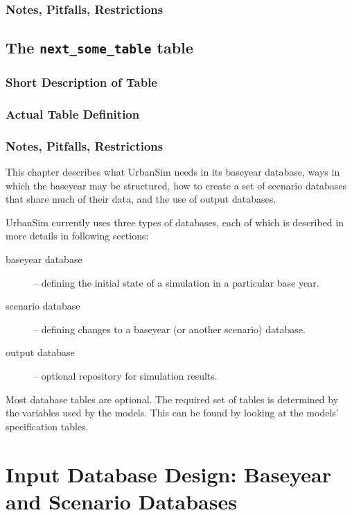 \subsubsection{Notes, Pitfalls, Restrictions}
\subsection{The {\tt next_some_table} table}
\subsubsection{Short Description of Table}
\subsubsection{Actual Table Definition}
\subsubsection{Notes, Pitfalls, Restrictions}

This chapter describes what UrbanSim needs in its baseyear database, ways in
which the baseyear may be structured, how to create a set of scenario databases
that share much of their data, and the use of output databases.

UrbanSim currently uses three types of databases, each of which is described in
more details in following sections:

\begin{description}
\item[baseyear database] -- defining the initial state of a simulation in a
particular base year.
\item[scenario database] -- defining changes to a baseyear (or another scenario)
database.
\item[output database] -- optional repository for simulation results.
\end{description}

Most database tables are optional. The required set of tables is determined by
the variables \variablesindex used by the models.  This can be found by looking at the models'
specification tables.






\section{Input Database Design: Baseyear and Scenario Databases}
\label{urbansim-database-tables-baseyear-scenario-db}

